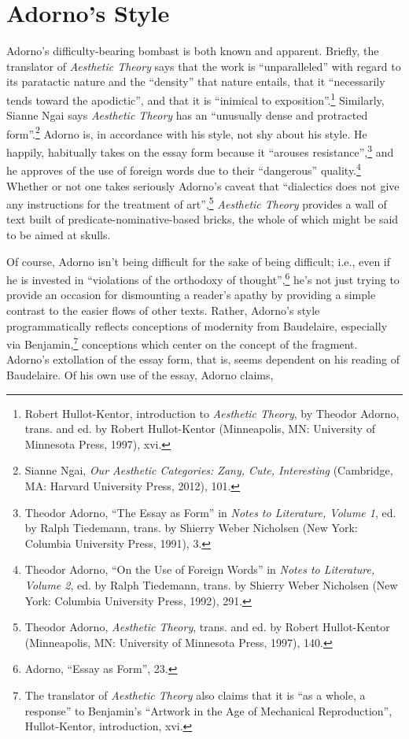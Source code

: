 \documentclass[12pt]{article}
\begin{document}
\section{Adorno's Style}
Adorno's difficulty-bearing bombast is both known and apparent. Briefly, the translator of \textit{Aesthetic Theory} says that the work is ``unparalleled'' with regard to its paratactic nature and the ``density'' that nature entails, that it ``necessarily tends toward the apodictic'', and that it is ``inimical to exposition''.\footnote{Robert Hullot-Kentor, introduction to \textit{Aesthetic Theory}, by Theodor Adorno, trans. and ed. by Robert Hullot-Kentor (Minneapolis, MN: University of Minnesota Press, 1997), xvi.} Similarly, Sianne Ngai says \textit{Aesthetic Theory} has an ``unusually dense and protracted form''.\footnote{Sianne Ngai, \textit{Our Aesthetic Categories: Zany, Cute, Interesting} (Cambridge, MA: Harvard University Press, 2012), 101.} Adorno is, in accordance with his style, not shy about his style. He happily, habitually takes on the essay form because it ``arouses resistance'',\footnote{Theodor Adorno, ``The Essay as Form'' in \textit{Notes to Literature, Volume 1}, ed. by Ralph Tiedemann, trans. by Shierry Weber Nicholsen (New York: Columbia University Press, 1991), 3.} and he approves of the use of foreign words due to their ``dangerous'' quality.\footnote{Theodor Adorno, ``On the Use of Foreign Words'' in \textit{Notes to Literature, Volume 2}, ed. by Ralph Tiedemann, trans. by Shierry Weber Nicholsen (New York: Columbia University Press, 1992), 291.} Whether or not one takes seriously Adorno's caveat that ``dialectics does not give any instructions for the treatment of art'',\footnote{Theodor Adorno, \textit{Aesthetic Theory}, trans. and ed. by Robert Hullot-Kentor (Minneapolis, MN: University of Minnesota Press, 1997), 140.} \textit{Aesthetic Theory} provides a wall of text built of predicate-nominative-based bricks, the whole of which might be said to be aimed at skulls.  

Of course, Adorno isn't being difficult for the sake of being difficult; i.e., even if he is invested in ``violations of the orthodoxy of thought'',\footnote{Adorno, ``Essay as Form'', 23.} he's not just trying to provide an occasion for dismounting a reader's apathy by providing a simple contrast to the easier flows of other texts. Rather, Adorno's style programmatically reflects conceptions of modernity from Baudelaire, especially via Benjamin,\footnote{The translator of \textit{Aesthetic Theory} also claims that it is ``as a whole, a response'' to Benjamin's ``Artwork in the Age of Mechanical Reproduction'', Hullot-Kentor,  introduction, xvi.} conceptions which center on the concept of the fragment. Adorno's extollation of the essay form, that is, seems dependent on his reading of Baudelaire. Of his own use of the essay, Adorno claims,   
\end{document}
